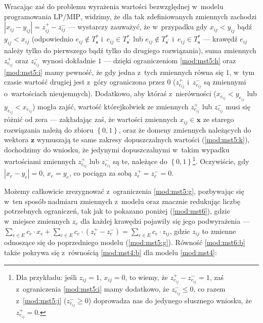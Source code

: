 Wracając zaś do problemu wyrażenia wartości bezwzględnej w~modelu programowania \textsc{LP}/\textsc{MIP}, widzimy, że dla tak zdefiniowanych zmiennych zachodzi $\left| x_{ij} - y_{ij} \right| = z_{ij}^{+} - z_{ij}^{-}$ --- wystarczy zauważyć, że w~przypadku gdy $x_{ij} < y_{ij}$ bądź $y_{ij} < x_{ij}$ (odpowiednio $e_{ij} \notin T^{\ast}_{\textbf{s}}$ i~$e_{ij} \in T^{\ast}_{\textbf{s}^{\prime}}$ lub $e_{ij} \notin T^{\ast}_{\textbf{s}^{\prime}}$ i~$e_{ij} \in T^{\ast}_{\textbf{s}}$ --- krawędź $e_{ij}$ należy tylko do pierwszego bądź tylko do drugiego rozwiązania), suma zmiennych $z_{e_{ij}}^{+}$ oraz $z_{e_{ij}}^{-}$ wynosi dokładnie $1$ --- dzięki ograniczeniom \ref{mod:mst5:h} oraz \ref{mod:mst5:i} mamy pewność, że gdy jedna z~tych zmiennych równa się $1$, w~tym czasie wartość drugiej jest z~góry ograniczona przez $0$ ($z^{+}_{e_{ij}}$ i~$z^{-}_{e_{ij}}$ są zmiennymi o~wartościach nieujemnych).
Dodatkowo, aby któraś z~nierówności ($x_{e_{ij}} < y_{e_{ij}}$ lub $y_{e_{ij}} < x_{e_{ij}}$) mogła zajść, wartość którejkolwiek ze zmiennych $z_{e_{ij}}^{+}$ lub $z_{e_{ij}}^{-}$ musi się różnić od zera --- zakładając zaś, że wartości zmiennych $x_{ij} \in \textbf{x}$ ze starego rozwiązania należą do zbioru $\left\{ 0 , 1 \right\}$, oraz że domeny zmiennych należących do wektora $\textbf{z}$ wymuszają te same zakresy dopuszczalnych wartości (\ref{mod:mst5:k}), dochodzimy do wniosku, że jedynymi dopuszczalnymi w~takim wypadku wartościami zmiennych $z_{e_{ij}}^{+}$ lub $z_{e_{ij}}^{-}$ są te, należące do $\left\{ 0, 1 \right\}$\footnote{
	Dla przykładu: jeśli $z_{ij} = 1$, $x_{ij} = 0$, to wiemy, że $z_{e_{ij}}^{+} - z_{e_{ij}}^{-} = 1$, zaś z~ograniczenia \ref{mod:mst5:i} mamy dodatkowo, że $z_{e_{ij}}^{-} \leqslant 0$, co razem z~\ref{mod:mst5:j} ($z_{e_{ij}}^{-} \geqslant 0$) doprowadza nas do jedynego słusznego wniosku, że $z_{e_{ij}}^{+} = 0$.
}.
Oczywiście, gdy $\left| x_{e} - y_{e} \right| = 0$, $x_{e} = y_{e}$, co pociąga za sobą $z_{e}^{+} = z_{e}^{-} = 0$.

Możemy całkowicie zrezygnować z~ograniczenia \ref{mod:mst5:g}, pozbywając się w~ten sposób nadmiaru zmiennych z~modelu oraz znacznie redukując liczbę potrzebnych ograniczeń, tak jak to pokazano poniżej (\ref{mod:mst6}), gdzie w~miejsce zmiennych $z_{e}$ dla każdej krawędzi pojawiły się jego podwyrażenia --- $\sum_{e \in E} c_{e} \cdot x_{e} + \sum_{e \in E} c_{e} \cdot \left( z^{+}_{e} - z^{-}_{e} \right) = \sum_{e \in E} c_{e} \cdot z_{ij}$, gdzie $z_{ij}$ to zmienne odnoszące się do poprzedniego modelu (\ref{mod:mst5:g}).
Równość \ref{mod:mst6:b} także pokrywa się z~równością \ref{mod:mst4:b} dla modelu \ref{mod:mst4}:

